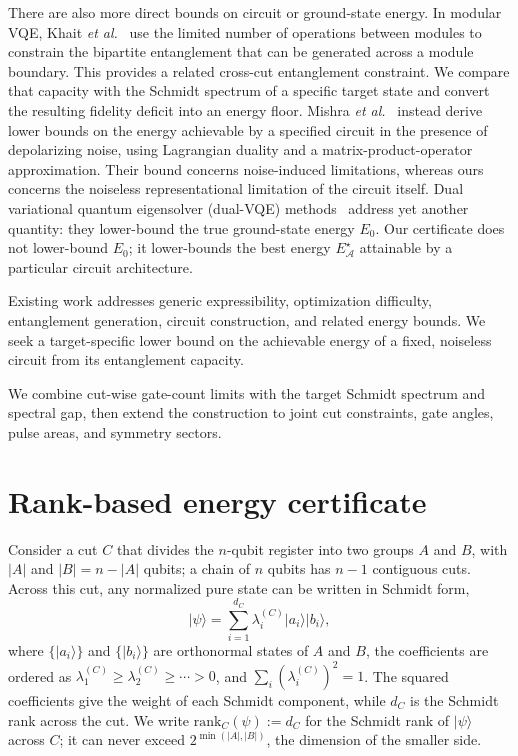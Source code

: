 \documentclass[reprint,aps,pra,floatfix,superscriptaddress,nofootinbib,longbibliography]{revtex4-2}
\theoremstyle{remark}
\theoremstyle{definition}
\newcommand{\calA}{\mathcal{A}}
\newcommand{\ket}[1]{\lvert #1 \rangle}
\newcommand{\rank}{\mathrm{rank}}
\begin{document}
There are also more direct bounds on circuit or ground-state energy. In modular
VQE, Khait \emph{et al.}~\cite{khait2023distributed} use the limited number of
operations between modules to constrain the bipartite entanglement that can be
generated across a module boundary. This provides a related cross-cut entanglement constraint. We compare that
capacity with the Schmidt spectrum of a specific target state and convert the
resulting fidelity deficit into an energy floor. Mishra \emph{et al.}~\cite{mishra2024classically} instead
derive lower bounds on the energy achievable by a specified circuit in the
presence of depolarizing noise, using Lagrangian duality and a
matrix-product-operator approximation. Their bound concerns noise-induced
limitations, whereas ours concerns the noiseless representational limitation of
the circuit itself. Dual variational quantum eigensolver (dual-VQE)
methods~\cite{westerheim2024dual} address yet another quantity: they lower-bound
the true ground-state energy $E_0$. Our certificate does not lower-bound $E_0$;
it lower-bounds the best energy $E_{\calA}^{\star}$ attainable by a particular
circuit architecture.

Existing work addresses generic expressibility, optimization difficulty,
entanglement generation, circuit construction, and related energy bounds. We seek a target-specific lower bound on the achievable energy of a fixed,
noiseless circuit from its entanglement capacity.

We combine cut-wise gate-count limits with the target Schmidt spectrum and
spectral gap, then extend the construction to joint cut constraints, gate
angles, pulse areas, and symmetry sectors.

\section{Rank-based energy certificate}
\label{sec:rank}

Consider a cut $C$ that
divides the $n$-qubit register into two groups $A$ and $B$, with $|A|$ and
$|B|=n-|A|$ qubits; a chain of $n$ qubits has $n-1$ contiguous cuts. Across this
cut, any normalized pure state can be written in Schmidt form,
\begin{equation}
  \label{eq:schmidt}
  \ket{\psi}=\sum_{i=1}^{d_C}\lambda_i^{(C)}\ket{a_i}\ket{b_i},
\end{equation}
where $\{\ket{a_i}\}$ and $\{\ket{b_i}\}$ are orthonormal states of $A$ and $B$,
the coefficients are ordered as $\lambda_1^{(C)}\ge\lambda_2^{(C)}\ge\cdots>0$,
and $\sum_i(\lambda_i^{(C)})^2=1$. The squared coefficients give the weight of
each Schmidt component, while $d_C$ is the Schmidt rank across the cut. We write
$\rank_C(\psi):=d_C$ for the Schmidt rank of $\ket{\psi}$ across $C$; it can
never exceed $2^{\min(|A|,|B|)}$, the dimension of the smaller side.
\end{document}
